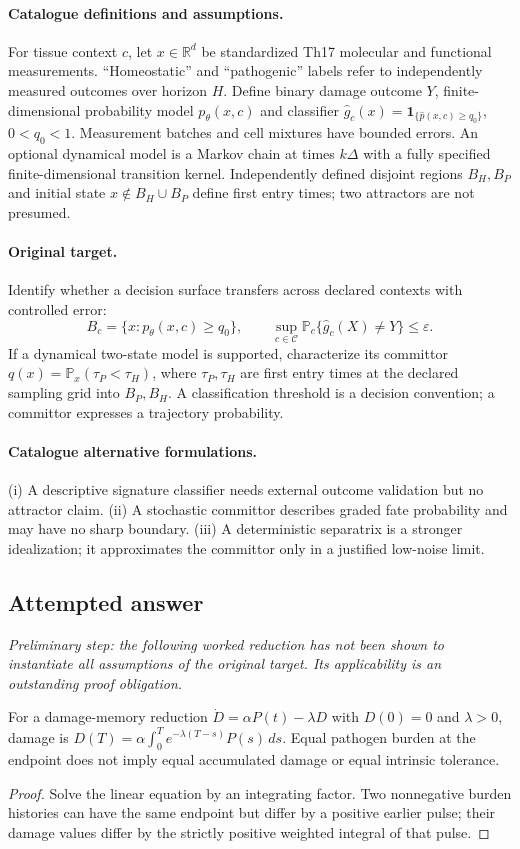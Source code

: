 \documentclass[11pt]{article}
\begin{document}
\paragraph{Catalogue definitions and assumptions.}
For tissue context $c$, let $x\in\mathbb{R}^d$ be standardized Th17 molecular and functional measurements. ``Homeostatic'' and ``pathogenic'' labels refer to independently measured outcomes over horizon $H$. Define binary damage outcome $Y$, finite-dimensional probability model $p_\theta(x,c)$ and classifier $\widehat g_c(x)=\mathbf1_{\{\widehat p(x,c)\geq q_0\}}$, $0<q_0<1$. Measurement batches and cell mixtures have bounded errors. An optional dynamical model is a Markov chain at times $k\Delta$ with a fully specified finite-dimensional transition kernel. Independently defined disjoint regions $B_H,B_P$ and initial state $x\notin B_H\cup B_P$ define first entry times; two attractors are not presumed.
\paragraph{Original target.}
Identify whether a decision surface transfers across declared contexts with controlled error:
\[B_c=\{x:p_\theta(x,c)\geq q_0\},\qquad
\sup_{c\in\mathcal C}\mathbb{P}_c\{\widehat g_c(X)\neq Y\}\leq\varepsilon.\]
If a dynamical two-state model is supported, characterize its committor $q(x)=\mathbb{P}_x(\tau_P<\tau_H)$, where $\tau_P,\tau_H$ are first entry times at the declared sampling grid into $B_P,B_H$. A classification threshold is a decision convention; a committor expresses a trajectory probability.
\paragraph{Catalogue alternative formulations.}
(i) A descriptive signature classifier needs external outcome validation but no attractor claim. (ii) A stochastic committor describes graded fate probability and may have no sharp boundary. (iii) A deterministic separatrix is a stronger idealization; it approximates the committor only in a justified low-noise limit.
\subsection{Attempted answer}
\noindent\emph{Preliminary step: the following worked reduction has not been shown to instantiate all assumptions of the original target. Its applicability is an outstanding proof obligation.}

\begin{proposition}
For a damage-memory reduction $\dot D=\alpha P(t)-\lambda D$ with $D(0)=0$ and $\lambda>0$, damage is $D(T)=\alpha\int_0^T e^{-\lambda(T-s)}P(s)\,ds$. Equal pathogen burden at the endpoint does not imply equal accumulated damage or equal intrinsic tolerance.
\end{proposition}
\begin{proof}
Solve the linear equation by an integrating factor. Two nonnegative burden histories can have the same endpoint but differ by a positive earlier pulse; their damage values differ by the strictly positive weighted integral of that pulse.
\end{proof}
\end{document}

